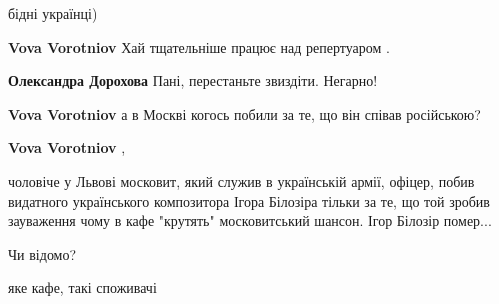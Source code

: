 \begin{itemize}
\begin{itemize}
бідні українці)

 
\textbf{Vova Vorotniov} Хай тщательніше працює над репертуаром .

 
\textbf{Олександра Дорохова} Пані, перестаньте звиздіти. Негарно!

 
\textbf{Vova Vorotniov} а в Москві когось побили за те, що він співав російською?

 
\textbf{Vova Vorotniov} , 

чоловіче у Львові московит, який служив в українській армії, офіцер, побив
видатного українського композитора Ігора Білозіра тільки за те, що той зробив
зауваження чому в кафе "крутять" московитський шансон. Ігор Білозір помер...

Чи відомо?

 
яке кафе, такі споживачі
\end{itemize}

 


\end{itemize}
